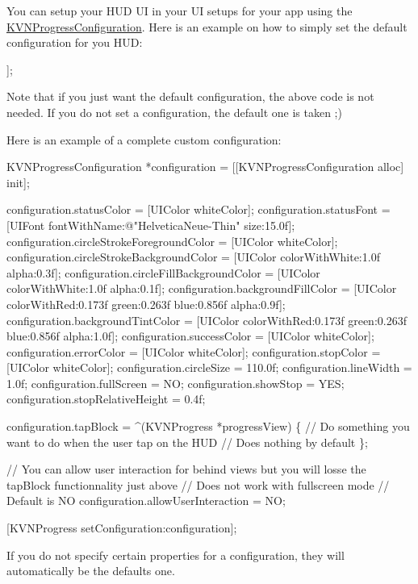 You can setup your H\+UD UI in your UI setups for your app using the {\ttfamily \mbox{\hyperlink{interface_k_v_n_progress_configuration}{K\+V\+N\+Progress\+Configuration}}}. Here is an example on how to simply set the default configuration for you H\+UD\+:


\begin{DoxyCode}
[KVNProgress setConfiguration:[KVNProgressConfiguration defaultConfiguration]];
\end{DoxyCode}


Note that if you just want the default configuration, the above code is not needed. If you do not set a configuration, the default one is taken ;)

Here is an example of a complete custom configuration\+:


\begin{DoxyCode}
 KVNProgressConfiguration *configuration = [[KVNProgressConfiguration alloc] init];

  configuration.statusColor = [UIColor whiteColor];
  configuration.statusFont = [UIFont fontWithName:@"HelveticaNeue-Thin" size:15.0f];
  configuration.circleStrokeForegroundColor = [UIColor whiteColor];
  configuration.circleStrokeBackgroundColor = [UIColor colorWithWhite:1.0f alpha:0.3f];
  configuration.circleFillBackgroundColor = [UIColor colorWithWhite:1.0f alpha:0.1f];
  configuration.backgroundFillColor = [UIColor colorWithRed:0.173f green:0.263f blue:0.856f alpha:0.9f];
  configuration.backgroundTintColor = [UIColor colorWithRed:0.173f green:0.263f blue:0.856f alpha:1.0f];
  configuration.successColor = [UIColor whiteColor];
  configuration.errorColor = [UIColor whiteColor];
  configuration.stopColor = [UIColor whiteColor];
  configuration.circleSize = 110.0f;
  configuration.lineWidth = 1.0f;
  configuration.fullScreen = NO;
  configuration.showStop = YES;
  configuration.stopRelativeHeight = 0.4f;

configuration.tapBlock = ^(KVNProgress *progressView) \{
  // Do something you want to do when the user tap on the HUD
  // Does nothing by default
\};

// You can allow user interaction for behind views but you will losse the tapBlock functionnality just
       above
// Does not work with fullscreen mode
// Default is NO
configuration.allowUserInteraction = NO;

  [KVNProgress setConfiguration:configuration];
\end{DoxyCode}


If you do not specify certain properties for a configuration, they will automatically be the default\textquotesingle{}s one.


